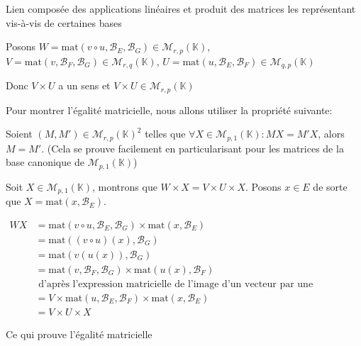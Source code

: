 \documentclass{article}
\begin{document}
\begin{question_kholle}
	[{Soient $E, F, G$, trois $\mathbb{K}$-espaces vectoriels de dimension finie $(p, q, r) \in (\mathbb{N}^{*})^{3}$
$\mathcal{B}_{E}, \mathcal{B}_{F}, \mathcal{B}_{G}$ des bases respectives de ces trois espaces vectoriels, et  $u \in \mathcal{L}_{\mathbb{K}}(E, F)$ $v \in \mathcal{L}_{\mathbb{K}}(F, G)$.
	
	Alors 
	\begin{equation}
		\mathrm{mat}(v \circ u, \mathcal{B}_{E}, \mathcal{B}_{G}) = \mathrm{mat}(v, \mathcal{B}_{F}, \mathcal{B}_{G}) \times \mathrm{mat}(u, \mathcal{B}_{E}, \mathcal{B}_{F})
	\end{equation}
	}]{Lien composée des applications linéaires et produit des matrices les représentant vis-à-vis de certaines bases}
	
	Posons $W = \mathrm{mat}(v \circ u, \mathcal{B}_{E}, \mathcal{B}_{G}) \in \mathcal{M}_{r, p}(\mathbb{K})$, $V=\mathrm{mat}(v, \mathcal{B}_{F}, \mathcal{B}_{G}) \in \mathcal{M}_{r, q}(\mathbb{K})$, $U = \mathrm{mat}(u, \mathcal{B}_{E}, \mathcal{B}_{F}) \in \mathcal{M}_{q, p}(\mathbb{K})$
	
	Donc $V \times U$ a un sens et $V \times U \in \mathcal{M}_{r, p}(\mathbb{K})$
	
	Pour montrer l'égalité matricielle, nous allons utiliser la propriété suivante:
	
	Soient $(M, M') \in \mathcal{M}_{r, p}(\mathbb{K})^{2}$ telles que $\forall X \in \mathcal{M}_{p, 1}(\mathbb{K}): MX = M'X$, alors $M = M'$. (Cela se prouve facilement en particularisant pour les matrices de la base canonique de $\mathcal{M}_{p,1}(\mathbb{K})$)
	
	Soit $X \in \mathcal{M}_{p, 1}(\mathbb{K})$, montrons que $W \times X = V \times U \times X$.
	Posons $x \in E$ de sorte que $X = \mathrm{mat}(x, \mathcal{B}_{E})$.
	
	\begin{align*}
		WX &= \mathrm{mat}(v \circ  u, \mathcal{B}_{E}, \mathcal{B}_{G})\times \mathrm{ mat}(x, \mathcal{B}_{E}) \\
		&= \mathrm{mat}((v \circ  u)(x), \mathcal{B}_{G}) \\
		&= \mathrm{mat}(v(u(x)), \mathcal{B}_{G}) \\
		&= \mathrm{mat}(v, \mathcal{B}_{F}, \mathcal{B}_{G}) \times \mathrm{mat}(u(x), \mathcal{B}_{F}) \\
		&\text{ d'après l'expression matricielle de l'image d'un vecteur par une application linéaire}\\
		&= V \times \mathrm{mat}(u, \mathcal{B}_{E}, \mathcal{B}_{F})\times \mathrm{ mat }(x, \mathcal{B}_{E}) \\
		&= V\times U\times X
	\end{align*}
	
	Ce qui prouve l'égalité matricielle
\end{question_kholle}
\end{document}
